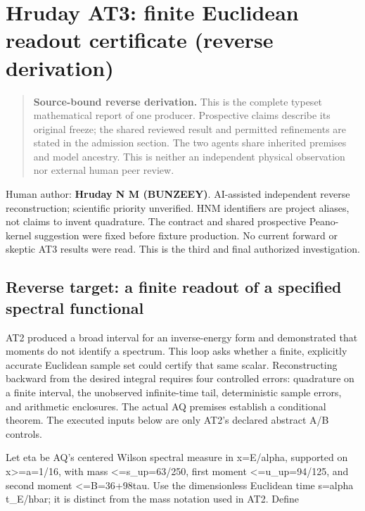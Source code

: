 \hypertarget{r30-at3-reverse-hruday-finite-euclidean-readout-certificate-independent-reverse-at3}{%
\section{Hruday AT3: finite Euclidean readout certificate (reverse derivation)}\label{r30:at3:reverse:r30-at3-reverse-hruday-finite-euclidean-readout-certificate-independent-reverse-at3}}

\begin{quote}\small\textbf{Source-bound reverse derivation.} This is the complete typeset mathematical report of one producer. Prospective claims describe its original freeze; the shared reviewed result and permitted refinements are stated in the admission section. The two agents share inherited premises and model ancestry. This is neither an independent physical observation nor external human peer review.\end{quote}
Human author: \textbf{Hruday N M (BUNZEEY)}. AI-assisted independent reverse reconstruction; scientific priority unverified. HNM identifiers are project aliases, not claims to invent quadrature. The contract and shared prospective Peano-kernel suggestion were fixed before fixture production. No current forward or skeptic AT3 results were read. This is the third and final authorized investigation.

\hypertarget{r30-at3-reverse-reverse-target-a-finite-readout-of-a-specified-spectral-functional}{%
\subsection{Reverse target: a finite readout of a specified spectral functional}\label{r30:at3:reverse:r30-at3-reverse-reverse-target-a-finite-readout-of-a-specified-spectral-functional}}

AT2 produced a broad interval for an inverse-energy form and demonstrated that moments do not identify a spectrum. This loop asks whether a finite, explicitly accurate Euclidean sample set could certify that same scalar. Reconstructing backward from the desired integral requires four controlled errors: quadrature on a finite interval, the unobserved infinite-time tail, deterministic sample errors, and arithmetic enclosures. The actual AQ premises establish a conditional theorem. The executed inputs below are only AT2's declared abstract A/B controls.

Let eta be AQ's centered Wilson spectral measure in x=E/alpha, supported on x\textgreater=a=1/16, with mass \textless=s\_up=63/250, first moment \textless=u\_up=94/125, and second moment \textless=B=36+98\textbar tau\textbar. Use the dimensionless Euclidean time s=alpha t\_E/hbar; it is distinct from the mass notation used in AT2. Define


